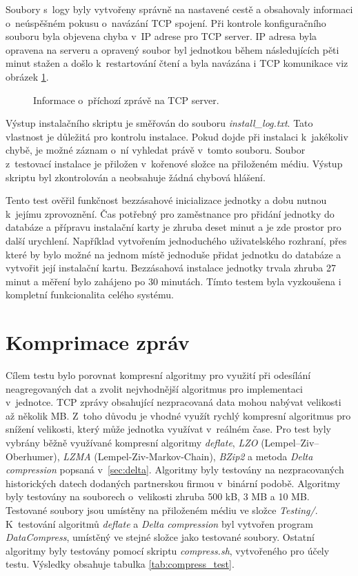 Soubory s~logy byly vytvořeny správně na nastavené cestě a obsahovaly informaci o~neúspěšném pokusu o~navázání TCP spojení. Při kontrole konfiguračního souboru byla objevena chyba v~IP adrese pro TCP server. IP adresa byla opravena na serveru a opravený soubor byl jednotkou během následujících pěti minut stažen a došlo k~restartování čtení a byla navázána i TCP komunikace viz obrázek \ref{pic:tcpinstall}. 
\begin{figure}
  \centering
  \caption{Informace o~příchozí zprávě na TCP server.}\label{pic:tcpinstall}
\end{figure}
Výstup instalačního skriptu je směřován do souboru \textit{install\_log.txt}. Tato vlastnost je důležitá pro kontrolu instalace. Pokud dojde při instalaci k~jakékoliv chybě, je možné záznam o~ní vyhledat právě v~tomto souboru. Soubor z~testovací instalace je přiložen v~kořenové složce na přiloženém médiu. Výstup skriptu byl zkontrolován a neobsahuje žádná chybová hlášení.

Tento test ověřil funkčnost bezzásahové inicializace jednotky a dobu nutnou k~jejímu zprovoznění. Čas potřebný pro zaměstnance pro přidání jednotky do databáze a přípravu instalační karty je zhruba deset minut a je zde prostor pro další urychlení. Například vytvořením jednoduchého uživatelského rozhraní, přes které by bylo možné na jednom místě jednoduše přidat jednotku do databáze a vytvořit její instalační kartu. Bezzásahová instalace jednotky trvala zhruba 27 minut a měření bylo zahájeno po 30 minutách. Tímto testem byla vyzkoušena i kompletní funkcionalita celého systému.

\section{Komprimace zpráv}
Cílem testu bylo porovnat kompresní algoritmy pro využití při odesílání neagregovaných dat a zvolit nejvhodnější algoritmus pro implementaci v~jednotce. TCP zprávy obsahující nezpracovaná data mohou nabývat velikosti až několik MB. Z~toho důvodu je vhodné využít rychlý kompresní algoritmus pro snížení velikosti, který může jednotka využívat v~reálném čase. Pro test byly vybrány běžně využívané kompresní algoritmy \textit{deflate}, \textit{LZO} (Lempel–Ziv–Oberhumer), \textit{LZMA} (Lempel-Ziv-Markov-Chain), \textit{BZip2} a metoda \textit{Delta compression} popsaná v~\ref{sec:delta}. Algoritmy byly testovány na nezpracovaných historických datech dodaných partnerskou firmou v~binární podobě. Algoritmy byly testovány na souborech o~velikosti zhruba 500 kB, 3 MB a 10 MB. Testované soubory jsou umístěny na přiloženém médiu ve složce \textit{Testing/}. K~testování algoritmů \textit{deflate} a \textit{Delta compression} byl vytvořen program \textit{DataCompress}, umístěný ve stejné složce jako testované soubory. Ostatní algoritmy byly testovány pomocí skriptu \textit{compress.sh}, vytvořeného pro účely testu. Výsledky obsahuje tabulka \ref{tab:compress_test}.

